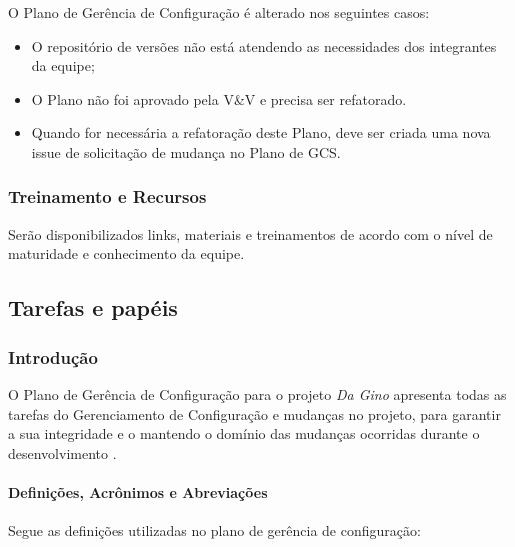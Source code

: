 O Plano de Gerência de Configuração é alterado nos seguintes casos:

\begin{itemize}
\item O repositório de versões não está atendendo as necessidades dos integrantes da equipe;
\item O Plano não foi aprovado pela V\&V e precisa ser refatorado.
\item Quando for necessária a refatoração deste Plano, deve ser criada uma nova issue de solicitação de mudança no Plano de GCS.
\end{itemize}

\subsubsection{Treinamento e Recursos}

Serão disponibilizados links, materiais e treinamentos de acordo com o nível de maturidade e conhecimento da equipe.


\subsection{Tarefas e papéis}

\subsubsection{Introdução}

O Plano de Gerência de Configuração para o projeto \textit{Da Gino} apresenta todas as tarefas do Gerenciamento de Configuração e mudanças no projeto, para garantir a sua integridade e o mantendo o domínio das mudanças ocorridas durante o desenvolvimento \cite{moraes:16}.

\paragraph{Definições, Acrônimos e Abreviações}

Segue as definições utilizadas no plano de gerência de configuração:

